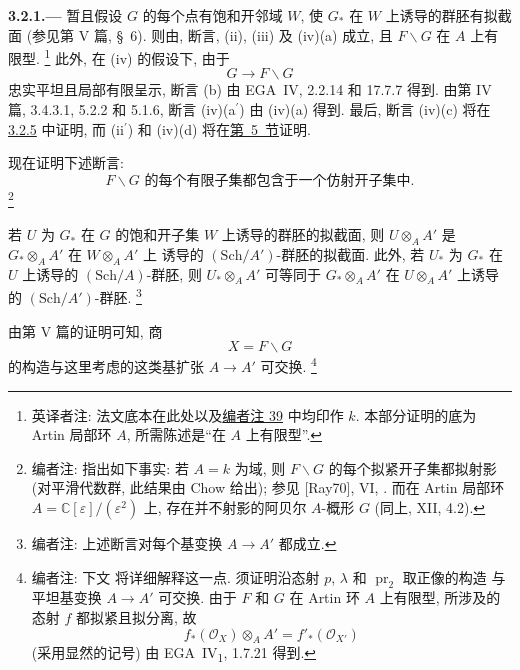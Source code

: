 
\medskip
{}\label{par:sga3-VIA-3.2.1}%
\noindent\textbf{3.2.1.---}
暂且假设 \(G\) 的每个点有饱和开邻域 \(W\),
使 \(G_*\) 在 \(W\) 上诱导的群胚有拟截面 (参见第 V 篇, \S~6).
则由,
断言, (ii), (iii) 及 (iv)(a) 成立,
且 \(F\backslash G\) 在 \(A\) 上有限型.\begingroup
\renewcommand{\thefootnote}{\fnsymbol{footnote}}%
\footnote[1]{英译者注: 法文底本在此处以及\hyperref[note:sga3-VIA-39]{编者注 39} 中均印作 \(k\).
本部分证明的底为 Artin 局部环 \(A\), 所需陈述是``在 \(A\) 上有限型''.}%
\endgroup
此外, 在 (iv) 的假设下, 由于
\[
  G\longrightarrow F\backslash G
\]
忠实平坦且局部有限呈示, 断言 (b) 由 EGA~IV, 2.2.14 和 17.7.7 得到.
由第 IV 篇, 3.4.3.1, 5.2.2 和 5.1.6,
断言 (iv)(a\(^{\prime}\)) 由 (iv)(a) 得到.
最后, 断言 (iv)(c) 将在\hyperref[par:sga3-VIA-3.2.5]{3.2.5} 中证明,
而 (ii\(^{\prime}\)) 和 (iv)(d) 将在\hyperref[sec:sga3-VIA-5]{第~5~节}证明.

现在证明下述断言:
\[
  \tag{\(\dagger\)}\label{eq:sga3-VIA-3.2.1-dagger}
  \text{\(F\backslash G\) 的每个有限子集都包含于一个仿射开子集中.}
\]%
\footnote{\label{note:sga3-VIA-35}编者注: 指出如下事实: 若 \(A=k\) 为域,
则 \(F\backslash G\) 的每个拟紧开子集都拟射影
(对平滑代数群, 此结果由 Chow 给出);
参见 [Ray70], VI, .
而在 Artin 局部环 \(A=\mathbb C[\varepsilon]/(\varepsilon^2)\) 上,
存在并不射影的阿贝尔 \(A\)-概形 \(G\) (同上, XII, 4.2).}

若 \(U\) 为 \(G_*\) 在 \(G\) 的饱和开子集 \(W\) 上诱导的群胚的拟截面,
则 \(U\otimes_AA'\) 是 \(G_*\otimes_AA'\) 在 \(W\otimes_AA'\) 上
诱导的 \((\mathrm{Sch}/A')\)-群胚的拟截面.
此外, 若 \(U_*\) 为 \(G_*\) 在 \(U\) 上诱导的 \((\mathrm{Sch}/A)\)-群胚,
则 \(U_*\otimes_AA'\) 可等同于 \(G_*\otimes_AA'\)
在 \(U\otimes_AA'\) 上诱导的 \((\mathrm{Sch}/A')\)-群胚.%
\footnote{\label{note:sga3-VIA-36}编者注: 上述断言对每个基变换 \(A\to A'\) 都成立.}

由第 V 篇的证明可知, 商
\[
  X=F\backslash G
\]
的构造与这里考虑的这类基扩张 \(A\to A'\) 可交换.%
\footnote{\label{note:sga3-VIA-37}编者注: 下文 将详细解释这一点.
须证明沿态射 \(p\), \(\lambda\) 和 \(\operatorname{pr}_2\) 取正像的构造
与平坦基变换 \(A\to A'\) 可交换.
由于 \(F\) 和 \(G\) 在 Artin 环 \(A\) 上有限型,
所涉及的态射 \(f\) 都拟紧且拟分离, 故
\[
  f_*(\mathcal O_X)\otimes_AA'
  =
  f'_*(\mathcal O_{X'})
\]
(采用显然的记号) 由 EGA~IV\textsubscript{1}, 1.7.21 得到.}

